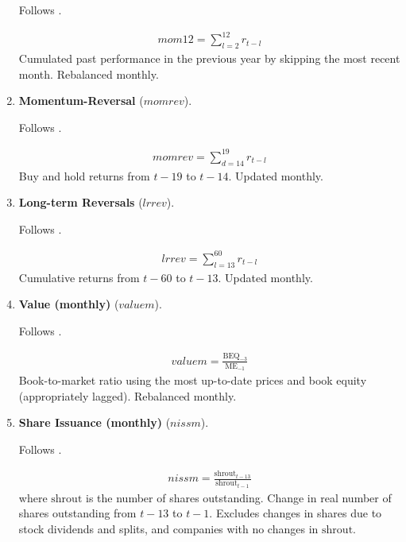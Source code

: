 \begin{enumerate}
	Follows . 
	
	\begin{align*}
		mom12 = \sum_{l=2}^{12} r_{t-l}
	\end{align*}
	Cumulated past performance in the previous year by skipping the most recent month. Rebalanced monthly.
	
	
	
	\item \textbf{Momentum-Reversal} ($momrev$). 
	
	Follows . 
	
	\begin{align*}
		momrev = \sum_{d=14}^{19} r_{t-l}
	\end{align*}
	Buy and hold returns from $t-19$ to $t-14$. Updated monthly.
	
	
	
	\item \textbf{Long-term Reversals} ($lrrev$). 
	
	Follows . 
	
	\begin{align*}
		lrrev = \sum_{l=13}^{60} r_{t-l} 
	\end{align*}
	Cumulative returns from $t-60$ to $t-13$. Updated monthly.
	
	
	
	\item \textbf{Value (monthly)} ($valuem$). 
	
	Follows . 
	
	\begin{align*}
		valuem = \frac{ \mathrm{BEQ}_{-3} }{ \mathrm{ME}_{-1} }
	\end{align*}
	Book-to-market ratio using the most up-to-date prices and book equity (appropriately lagged). Rebalanced monthly.
	
	
	
	\item \textbf{Share Issuance (monthly)} ($nissm$).
	
	Follows . 
	
	\begin{align*}
		nissm = \frac{ \mathrm{shrout}_{t-13} }{ \mathrm{shrout}_{t-1} }
	\end{align*}
	where $\mathrm{shrout}$ is the number of shares outstanding. Change in real number of shares outstanding from $t-13$ to $t-1$. Excludes changes in shares due to stock dividends and splits, and companies with no changes in $\mathrm{shrout}$.
	

\end{enumerate}
